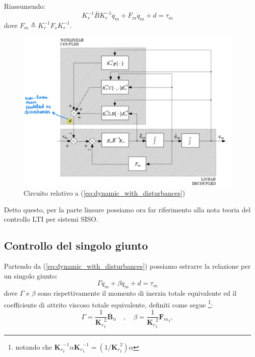 Riassumendo:
\begin{equation}\label{eq:dynamic_with_disturbances}
K_r^{-1}\bar{B}K_r^{-1}\ddot{q}_m + F_m\dot{q}_m + d = \tau_m
\end{equation}
dove $F_m \triangleq K_r^{-1}F_vK_r^{-1}$. 
\unboldmath



\begin{figure}[t]
	\centering
	\includegraphics[width=0.7\linewidth]{images/decentralized_joint_space_control_2}
	\caption{Circuito relativo a (\ref{eq:dynamic_with_disturbances})}
	\label{fig:decentralizedjointspacecontrol2}
\end{figure}

Detto questo, per la parte lineare possiamo ora far riferimento alla nota teoria del controllo LTI per sistemi SISO.






\subsection{Controllo del singolo giunto}\label{section:single_joint_control}

Partendo da (\ref{eq:dynamic_with_disturbances}) possiamo estrarre la relazione per un singolo giunto:
\begin{equation}\label{eq:single_joint_dynamic}
\Gamma \ddot{q}_m + \beta \dot{q}_m + d = \tau_m
\end{equation}
dove $\Gamma$ e $\beta$ sono rispettivamente il momento di inerzia totale equivalente ed il coefficiente di attrito viscoso totale equivalente, definiti come segue 
\footnote{notando che ${\mathbf{K}_r}_i^{-1} \alpha {\mathbf{K}_r}_i^{-1} = (1/{\mathbf{K}_r}_i^2) \alpha $}:
$$
\Gamma = \frac{1}{{\mathbf{K}_r}_i^2} \mathbf{\bar{B}}_{ii} 
\quad , \quad
\beta = \frac{1}{{\mathbf{K}_r}_i^2} {\mathbf{F}_m}_i, 
$$

